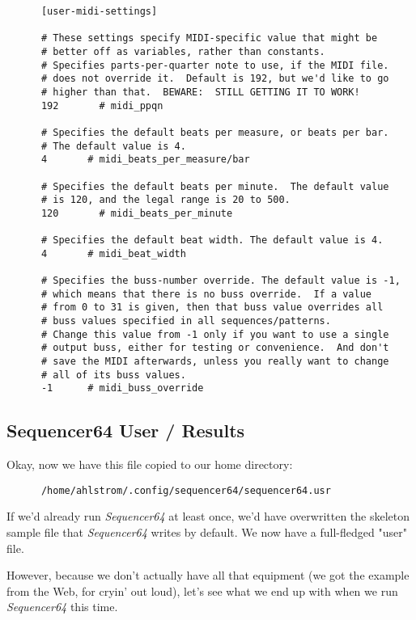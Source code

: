    \begin{verbatim}
      [user-midi-settings]

      # These settings specify MIDI-specific value that might be
      # better off as variables, rather than constants.
      # Specifies parts-per-quarter note to use, if the MIDI file.
      # does not override it.  Default is 192, but we'd like to go
      # higher than that.  BEWARE:  STILL GETTING IT TO WORK!
      192       # midi_ppqn

      # Specifies the default beats per measure, or beats per bar.
      # The default value is 4.
      4       # midi_beats_per_measure/bar

      # Specifies the default beats per minute.  The default value
      # is 120, and the legal range is 20 to 500.
      120       # midi_beats_per_minute

      # Specifies the default beat width. The default value is 4.
      4       # midi_beat_width

      # Specifies the buss-number override. The default value is -1,
      # which means that there is no buss override.  If a value
      # from 0 to 31 is given, then that buss value overrides all
      # buss values specified in all sequences/patterns.
      # Change this value from -1 only if you want to use a single
      # output buss, either for testing or convenience.  And don't
      # save the MIDI afterwards, unless you really want to change
      # all of its buss values.
      -1      # midi_buss_override
   \end{verbatim}

\subsection{Sequencer64 User / Results}
\label{subsec:seq64_usr_file_midi_bus_results}

   Okay, now we have this file copied to our home directory:

   \begin{verbatim}
      /home/ahlstrom/.config/sequencer64/sequencer64.usr
   \end{verbatim}

   If we'd already run \textsl{Sequencer64} at least once, we'd have
   overwritten the skeleton sample file that \textsl{Sequencer64}
   writes by default.  We now have a full-fledged "user" file.

   However, because we don't actually have all that equipment (we got the
   example from the Web, for cryin' out loud), let's see what we end up with
   when we run \textsl{Sequencer64} this time.

